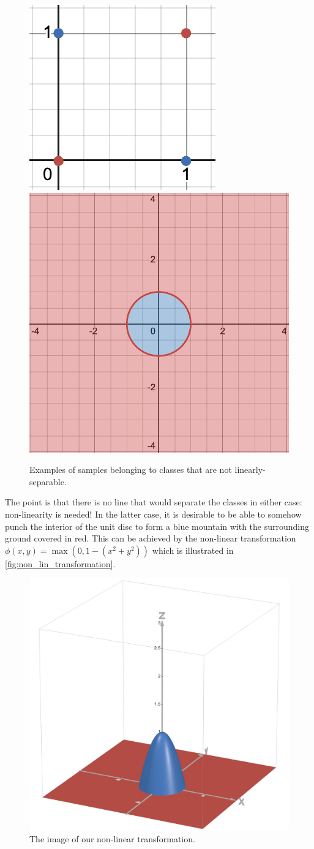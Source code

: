 \documentclass[11pt]{article}
\begin{document}
\begin{figure}[ht]
    \centering
    \includegraphics[width=0.40\columnwidth]{./figures/neural_nets/xor.png}
    \hspace{20pt}
    \includegraphics[width=0.40\columnwidth]{./figures/neural_nets/circle.png}
    \caption{\centering Examples of samples belonging to classes that are not linearly-separable.}
    \label{fig:non_linearly_separable}
\end{figure}

\noindent The point is that there is no line that would separate the classes in either case: non-linearity is needed! In the latter case, it is desirable to be able to somehow punch the interior of the unit disc to form a blue mountain with the surrounding ground covered in red. This can be achieved by the non-linear transformation $\phi(x,y)=\max(0,1-(x^2+y^2))$ which is illustrated in \autoref{fig:non_lin_transformation}.

\begin{figure}[ht]
    \centering
    \includegraphics[width=0.40\columnwidth]{./figures/neural_nets/non_lin_transform.png}
    \caption{\centering The image of our non-linear transformation.}
    \label{fig:non_lin_transformation}
\end{figure}
\end{document}
